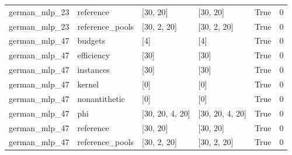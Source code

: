 \begin{tabular}{llllll}
german\_mlp\_23 & reference & [30, 20] & [30, 20] & True & 0 \\
german\_mlp\_23 & reference\_pools & [30, 2, 20] & [30, 2, 20] & True & 0 \\
german\_mlp\_47 & budgets & [4] & [4] & True & 0 \\
german\_mlp\_47 & efficiency & [30] & [30] & True & 0 \\
german\_mlp\_47 & instances & [30] & [30] & True & 0 \\
german\_mlp\_47 & kernel & [0] & [0] & True & 0 \\
german\_mlp\_47 & nonantithetic & [0] & [0] & True & 0 \\
german\_mlp\_47 & phi & [30, 20, 4, 20] & [30, 20, 4, 20] & True & 0 \\
german\_mlp\_47 & reference & [30, 20] & [30, 20] & True & 0 \\
german\_mlp\_47 & reference\_pools & [30, 2, 20] & [30, 2, 20] & True & 0 \\
\bottomrule
\end{tabular}
